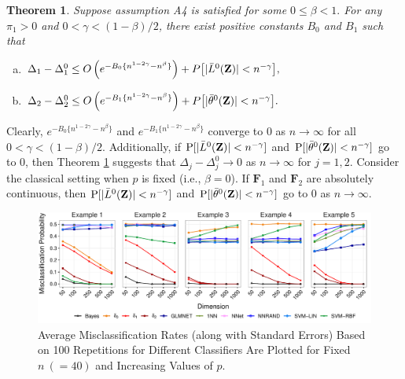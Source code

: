 \documentclass[twoside]{article}
\newcommand{\bZ}{\mathbf{Z}}
\newcommand{\bF}{\mathbf{F}}
\newcommand{\0}{\mathbf{0}}
\newcommand{\1}{\mathbf{1}}
\numberwithin{equation}{section}
\newtheorem{thm}{Theorem}[section]
\newtheorem{cor}[thm]{Corollary}
\begin{document}

\begin{thm}\label{d1thmUH}
Suppose assumption {\rm A4} is satisfied for some $0\le \beta <1.$ For any $\pi_1 >0$ and $0<\gamma <(1-\beta)/2$, there exist positive constants $B_0$ and $B_1$ such that
 \vspace{-0.25cm}
 \begin{enumerate}[(a)]
  \item $ \Delta_1-\Delta^0_1\\
  \leq O\left (e^{-B_0\{n^{1-2\gamma}-n^\beta\}}\right )+ P\big [|\bar{L}^0(\bZ)|<n^{-\gamma}\big ],$
  \item $ \Delta_2-\Delta^0_2\\
  \leq O\left (e^{-B_1\{n^{1-2\gamma}-n^\beta\}}\right )+P\big [|\bar{\theta}^0(\bZ)|<n^{-\gamma}\big ].$
 \end{enumerate}
\end{thm}

Clearly, $e^{-B_0 \{n^{1-2\gamma}-n^{\beta}\}}$ and $e^{-B_1\{ n^{1-2\gamma}-n^\beta\}}$ converge to 0 as $n\to\infty$ for all $0<\gamma<(1-\beta)/2.$ Additionally, if ${\rm P}[|\bar{L}^0(\bZ)|< n^{-\gamma}]$ and ${\rm P}[|\bar{\theta}^0(\bZ)|< n^{-\gamma}]$ go to 0, then Theorem \ref{d1thmUH} suggests that $\Delta_{j} - \Delta^0_j\to 0$ as $n\to\infty$ for $j=1,2.$ Consider the classical setting when $p$ is fixed (i.e., $\beta=0$). If $\bF_1$ and $\bF_2$ are absolutely continuous, then ${\rm P}[|\bar{L}^0(\bZ)|< n^{-\gamma}]$ and ${\rm P}[|\bar{\theta}^0(\bZ)|< n^{-\gamma}]$ go to 0 as $n\to\infty.$
\begin{figure}[b]
  \centering
    \includegraphics[width = \textwidth, height = 0.3\textwidth]{simu_plot_wide.pdf}
  \caption{Average Misclassification Rates (along with Standard Errors) Based on 100 Repetitions for Different Classifiers Are Plotted for Fixed $n\ (=40)$ and Increasing Values of $p$.}
  \label{completesim}
\end{figure}
\end{document}
